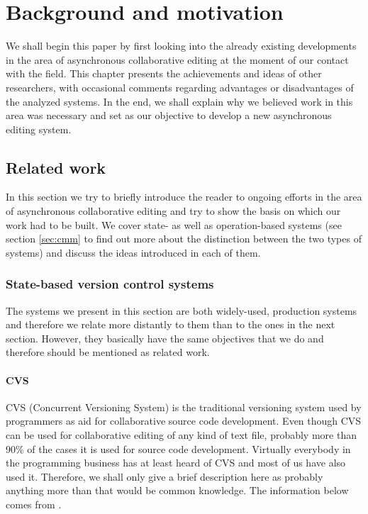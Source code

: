 \chapter{Background and motivation}

We shall begin this paper by first looking into the already existing developments in the area of
asynchronous collaborative editing at the moment of our contact with the field. This chapter presents
the achievements and ideas of other researchers, with occasional comments regarding advantages or
disadvantages of the analyzed systems. In the end, we shall explain why we believed work in this
area was necessary and set as our objective to develop a new asynchronous editing system.

\section{Related work}

In this section we try to briefly introduce the reader to ongoing efforts in the area of asynchronous
collaborative editing and try to show the basis on which our work had to be built. We cover state-
as well as operation-based systems (see section \ref{sec:cmm} to find out more about the distinction
between the two types of systems) and discuss the ideas introduced in each of them.

\subsection{State-based version control systems}

The systems we present in this section are both widely-used, production systems and therefore we
relate more distantly to them than to the ones in the next section. However, they basically have
the same objectives that we do and therefore should be mentioned as related work.

\subsubsection{CVS}

CVS (Concurrent Versioning System) is the traditional versioning system used by programmers as aid for
collaborative source code development. Even though CVS can be used for collaborative editing of any
kind of text file, probably more than 90\% of the cases it is used for source code development. Virtually
everybody in the programming business has at least heard of CVS and most of us have also used it. Therefore,
we shall only give a brief description here as probably anything more than that would be common knowledge.
The information below comes from \cite{cvs}.

